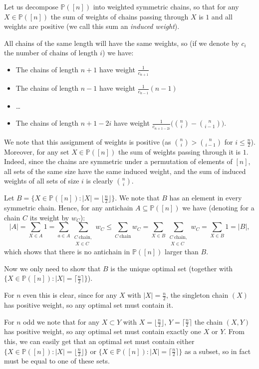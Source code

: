 \documentclass[11pt, reqno]{amsart}
\numberwithin{equation}{section}
\begin{document}
Let us decompose $\mathbb{P}([n])$ into weighted symmetric chains, so that for any $X \in \mathbb{P}([n])$ the sum of weights of chains passing through $X$ is $1$ and all weights are positive (we call this sum an \emph{induced weight}).

All chains of the same length will have the same weights, so (if we denote by $c_i$ the number of chains of length $i$) we have:
\begin{itemize}
    \item The chains of length $n+1$ have weight $\frac{1}{c_{n+1}}$
    \item The chains of length $n-1$ have weight $\frac{1}{c_{n-1}}(n-1)$
    \item \dots
    \item The chains of length $n+1-2i$ have weight $\frac{1}{c_{n+1-2i}}\Big( \binom{n}{i} - \binom{n}{i-1} \Big)$.
\end{itemize}
We note that this assignment of weights is positive (as $\binom{n}{i}>\binom{n}{i-1}$ for $i \leqslant \frac{n}{2}$). Moreover, for any set $X \in \mathbb{P}([n])$ the sum of weights passing through it is $1$. Indeed, since the chains are symmetric under a permutation of elements of $[n]$, all sets of the same size have the same induced weight, and the sum of induced weights of all sets of size $i$ is clearly $\binom{n}{i}$.

Let $B = \{X \in \mathbb{P}([n]): |X|= \lfloor \frac{n}{2} \rfloor\}$. We note that $B$ has an element in every symmetric chain.
Hence, for any antichain $A \subseteq \mathbb{P}([n])$ we have (denoting for a chain $C$ its weight by $w_C$):
\begin{equation*}
    |A| = \sum_{X \in A} 1 = \sum_{a \in A} \sum_{\substack{C \ \text{chain}, \\ \ X \in C}} w_{C} \leqslant \sum_{C \ \text{chain}} w_C = \sum_{X \in B} \sum_{\substack{C \ \text{chain}, \\ \ X \in C}} w_{C} = \sum_{X \in B} 1 = |B|,
\end{equation*}
which shows that there is no antichain in $\mathbb{P}([n])$ larger than $B$.

Now we only need to show that $B$ is the unique optimal set (together with $\{X \in \mathbb{P}([n]): |X|=\lceil \frac{n}{2} \rceil\}$).

For $n$ even this is clear, since for any $X$ with $|X|=\frac{n}{2}$, the singleton chain $(X)$ has positive weight, so any optimal set must contain it.

For $n$ odd we note that for any $X \subset Y$ with $X=\lfloor \frac{n}{2} \rfloor$, $Y=\lceil \frac{n}{2} \rceil$ the chain $(X, Y)$ has positive weight, so any optimal set must contain exactly one $X$ or $Y$. From this, we can easily get that an optimal set must contain either $\{X \in \mathbb{P}([n]): |X|=\lfloor \frac{n}{2} \rfloor\}$ or $\{X \in \mathbb{P}([n]): |X|=\lceil \frac{n}{2} \rceil\}$ as a subset, so in fact must be equal to one of these sets.
\end{document}
